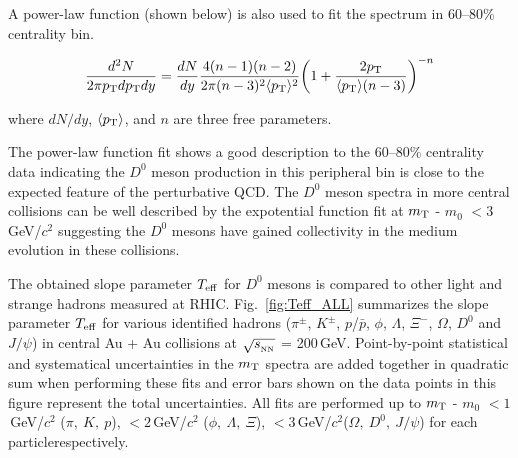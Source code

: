 \documentclass[%
 reprint,	
 amsmath,amssymb,
 aps,
 prc,
]{revtex4-1}
\providecommand{\DIFaddtex}[1]{{\protect\color{blue}\uwave{#1}}} %
\providecommand{\DIFaddbegin}{} %
\providecommand{\DIFaddend}{} %
\providecommand{\DIFadd}[1]{\texorpdfstring{\DIFaddtex{#1}}{#1}} %
\begin{document}
A power-law function (shown below) is also used to fit the spectrum in 60--80\% centrality bin. 

\[
\frac{d^2N}{2\pi p_{\rm T}dp_{\rm T}dy} = \frac{dN}{dy}\frac{4(n-1)(n-2)}{2\pi (n-3)^2\langle p_{\rm T} \rangle ^2}\bigg(1+\frac{2p_{\rm T}}{\langle p_{\rm T} \rangle (n-3)}\bigg)^{-n}
\]

where $dN/dy$, $\langle p_{\rm T}\rangle$, and $n$ are three free parameters.

The power-law function fit shows a good description to the 60--80\% centrality data indicating the $D^0$ meson production in this peripheral bin is close to the expected feature of the perturbative QCD. The $D^0$ meson spectra in more central collisions can be well described by the expotential function fit at $m_{\rm T}$ - $m_{0}$ $<3$\,GeV/$c^2$ suggesting the $D^0$ mesons have gained collectivity in the medium evolution in these collisions.




The obtained slope parameter $T_{\rm eff}$ for $D^0$ mesons is compared to other light and strange hadrons measured at RHIC. %
Fig.~\ref{fig:Teff_ALL} summarizes the slope parameter $T_{\rm eff}$ for various identified hadrons ($\pi^{\pm}$, $K^{\pm}$, $p$/$\bar{p}$, $\phi$, $\Lambda$, $\Xi^-$, $\Omega$, $D^0$ and $J/\psi$) in central Au + Au collisions at $\sqrt{s_{_{\rm NN}}}$ = 200\,GeV. Point-by-point statistical and systematical uncertainties in the $m_{\rm T}$ spectra are added together in quadratic sum when performing these fits and error bars shown on the data points in this figure represent the total uncertainties. All fits are performed up to $m_{\rm T}$ - $m_{0}$ $<1$\,GeV/$c^2$ ($\pi,\ K,\ p$), $<2$\,GeV/$c^2$ ($\phi,\ \Lambda,\ \Xi$), $<3$\,GeV/$c^2$($\Omega,\ D^{0},\ J/\psi$) for each particle\DIFaddbegin \DIFadd{, }\DIFaddend respectively. 
\end{document}
